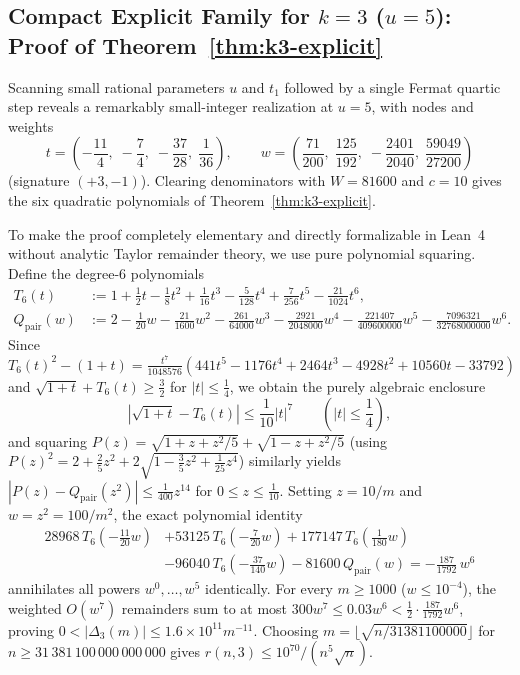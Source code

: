\documentclass[11pt,a4paper]{article}
\theoremstyle{definition}
\theoremstyle{remark}
\begin{document}
\subsection{Compact Explicit Family for $k = 3$ ($u = 5$): Proof of Theorem~\ref{thm:k3-explicit}}

Scanning small rational parameters $u$ and $t_1$ followed by a single Fermat quartic step reveals a remarkably small-integer realization at $u = 5$, with nodes and weights
\[
t = \left(-\frac{11}{4},\; -\frac{7}{4},\; -\frac{37}{28},\; \frac{1}{36}\right), \qquad
w = \left(\frac{71}{200},\; \frac{125}{192},\; -\frac{2401}{2040},\; \frac{59049}{27200}\right)
\]
(signature $(+3, -1)$). Clearing denominators with $W = 81600$ and $c = 10$ gives the six quadratic polynomials of Theorem~\ref{thm:k3-explicit}.

To make the proof completely elementary and directly formalizable in Lean~4 without analytic Taylor remainder theory, we use pure polynomial squaring. Define the degree-$6$ polynomials
\begin{align*}
T_6(t) &:= 1 + \frac{1}{2} t - \frac{1}{8} t^2 + \frac{1}{16} t^3 - \frac{5}{128} t^4 + \frac{7}{256} t^5 - \frac{21}{1024} t^6, \\
Q_{\mathrm{pair}}(w) &:= 2 - \frac{1}{20} w - \frac{21}{1600} w^2 - \frac{261}{64000} w^3 - \frac{2921}{2048000} w^4 - \frac{221407}{409600000} w^5 - \frac{7096321}{32768000000} w^6.
\end{align*}
Since $T_6(t)^2 - (1 + t) = \frac{t^7}{1048576}(441 t^5 - 1176 t^4 + 2464 t^3 - 4928 t^2 + 10560 t - 33792)$ and $\sqrt{1 + t} + T_6(t) \ge \frac{3}{2}$ for $|t| \le \frac{1}{4}$, we obtain the purely algebraic enclosure
\[
\left|\sqrt{1 + t} - T_6(t)\right| \le \frac{1}{10} |t|^7 \qquad \left(|t| \le \frac{1}{4}\right),
\]
and squaring $P(z) = \sqrt{1 + z + z^2/5} + \sqrt{1 - z + z^2/5}$ (using $P(z)^2 = 2 + \frac{2}{5} z^2 + 2\sqrt{1 - \frac{3}{5} z^2 + \frac{1}{25} z^4}$) similarly yields $|P(z) - Q_{\mathrm{pair}}(z^2)| \le \frac{1}{400} z^{14}$ for $0 \le z \le \frac{1}{10}$. Setting $z = 10/m$ and $w = z^2 = 100/m^2$, the exact polynomial identity
\begin{align*}
28968\, T_6\!\left(-\tfrac{11}{20} w\right) &+ 53125\, T_6\!\left(-\tfrac{7}{20} w\right) + 177147\, T_6\!\left(\tfrac{1}{180} w\right) \\
&- 96040\, T_6\!\left(-\tfrac{37}{140} w\right) - 81600\, Q_{\mathrm{pair}}(w) = -\frac{187}{1792}\, w^6
\end{align*}
annihilates all powers $w^0, \dots, w^5$ identically. For every $m \ge 1000$ ($w \le 10^{-4}$), the weighted $O(w^7)$ remainders sum to at most $300 w^7 \le 0.03 w^6 < \frac{1}{2} \cdot \frac{187}{1792} w^6$, proving $0 < |\Delta_3(m)| \le 1.6 \times 10^{11} m^{-11}$. Choosing $m = \lfloor \sqrt{n / 31381100000} \rfloor$ for $n \ge 31\,381\,100\,000\,000\,000$ gives $r(n, 3) \le 10^{70} / (n^5 \sqrt{n})$.
\end{document}
